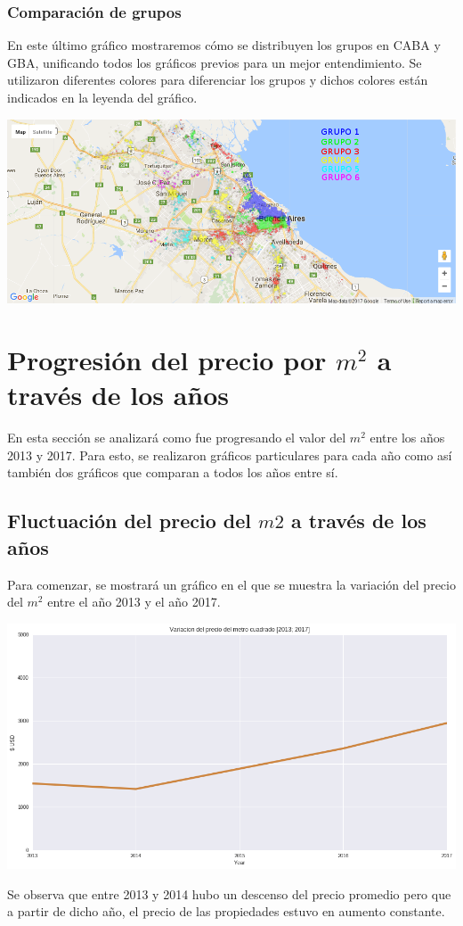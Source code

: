 \documentclass[a4paper, 10pt]{article}
\newcommand\tab[1][0.5cm]{\hspace*{#1}}
\begin{document}
				\subsubsection{Comparación de grupos}
					En este último gráfico mostraremos cómo se distribuyen los grupos en CABA y GBA, unificando todos los gráficos
					previos para un mejor entendimiento. Se utilizaron diferentes colores para diferenciar los grupos y dichos
					colores están indicados en la leyenda del gráfico.
					\begin{center}
						\includegraphics[width=\textwidth]{images/m2GroupComparison}
				  	\end{center}
		\section{Progresión del precio por $m^2$ a través de los años}
			En esta sección se analizará como fue progresando el valor del $m^2$ entre los años 2013 y 2017. Para esto,
			se realizaron gráficos particulares para cada año como así también dos gráficos que comparan a todos los años entre sí.
			\subsection{Fluctuación del precio del $m2$ a través de los años}
				Para comenzar, se mostrará un gráfico en el que se muestra la variación del precio del $m^2$ entre el año 2013 y el 
				año 2017.
				\begin{center}
					\includegraphics[width=\textwidth]{images/m2ProgressionGeneral}
				\end{center}
				\tab Se observa que entre 2013 y 2014 hubo un descenso del precio promedio pero que a partir de dicho año, el precio
				de las propiedades estuvo en aumento constante.
\end{document}
